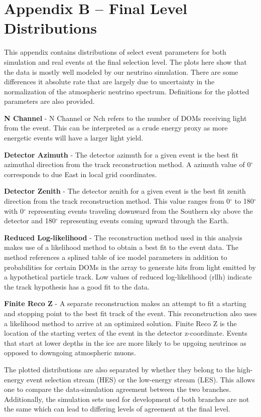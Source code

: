 \documentclass{gatech-thesis}
\begin{document}
\chapter{Appendix B -- Final Level Distributions}
This appendix contains distributions of select event parameters for both simulation and real events at the final selection level. The plots here show that the data is mostly well modeled by our neutrino simulation. There are some differences it absolute rate that are largely due to uncertainty in the normalization of the atmospheric neutrino spectrum. Definitions for the plotted parameters are also provided.
\begin{adjustwidth}{2.5em}{2.5em}
\setlength{\parindent}{0pt}
\textbf{N Channel} - N Channel or Nch refers to the number of DOMs receiving light from the event. This can be interpreted as a crude energy proxy as more energetic events will have a larger light yield.

\textbf{Detector Azimuth} - The detector azimuth for a given event is the best fit azimuthal direction from the track reconstruction method. A azimuth value of 0$^{\circ}$ corresponds to due East in local grid coordinates.

\textbf{Detector Zenith} - The detector zenith for a given event is the best fit zenith direction from the track reconstruction method. This value ranges from 0$^{\circ}$ to 180$^{\circ}$ with 0$^{\circ}$ representing events traveling downward from the Southern sky above the detector and 180$^{\circ}$ representing events coming upward through the Earth.

\textbf{Reduced Log-likelihood} - The reconstruction method used in this analysis makes use of a likelihood method to obtain a best fit to the event data. The method references a splined table of ice model parameters in addition to probabilities for certain DOMs in the array to generate hits from light emitted by a hypothetical particle track. Low values of reduced log-likelihood (rllh) indicate the track hypothesis has a good fit to the data.

\textbf{Finite Reco Z} - A separate reconstruction makes an attempt to fit a starting and stopping point to the best fit track of the event. This reconstruction also uses a likelihood method to arrive at an optimized solution. Finite Reco Z is the location of the starting vertex of the event in the detector z-coordinate. Events that start at lower depths in the ice are more likely to be upgoing neutrinos as opposed to downgoing atmospheric muons.
\end{adjustwidth}
The plotted distributions are also separated by whether they belong to the high-energy event selection stream (HES) or the low-energy stream (LES). This allows one to compare the data-simulation agreement between the two branches. Additionally, the simulation sets used for development of both branches are not the same which can lead to differing levels of agreement at the final level.
\end{document}

